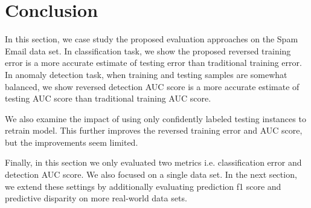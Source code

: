 \section{Conclusion}


In this section, we case study the proposed evaluation approaches 
on the Spam Email data set. In classification task, we show the 
proposed reversed training error is a more accurate estimate of 
testing error than traditional training error. In anomaly detection 
task, when training and testing samples are somewhat balanced, 
we show reversed detection AUC score is a more accurate estimate 
of testing AUC score than traditional training AUC score. 

We also examine the impact of using only confidently labeled 
testing instances to retrain model. This further improves 
the reversed training error and AUC score, but the improvements 
seem limited. 

Finally, in this section we only evaluated two metrics i.e. 
classification error and detection AUC score. We also focused 
on a single data set. 
In the next section, we extend these settings by additionally 
evaluating prediction f1 score and predictive disparity on 
more real-world data sets. 
